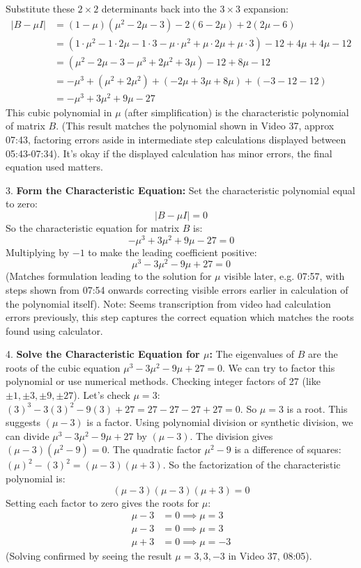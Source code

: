 \documentclass{article}
\begin{document}
    Substitute these $2 \times 2$ determinants back into the $3 \times 3$ expansion:
    \begin{align*} |B - \mu I| &= (1 - \mu)(\mu^2 - 2\mu - 3) - 2(6 - 2\mu) + 2(2\mu - 6) \\ &= (1 \cdot \mu^2 - 1 \cdot 2\mu - 1 \cdot 3 - \mu \cdot \mu^2 + \mu \cdot 2\mu + \mu \cdot 3) - 12 + 4\mu + 4\mu - 12 \\ &= (\mu^2 - 2\mu - 3 - \mu^3 + 2\mu^2 + 3\mu) - 12 + 8\mu - 12 \\ &= -\mu^3 + (\mu^2 + 2\mu^2) + (-2\mu + 3\mu + 8\mu) + (-3 - 12 - 12) \\ &= -\mu^3 + 3\mu^2 + 9\mu - 27 \end{align*}
    This cubic polynomial in $\mu$ (after simplification) is the characteristic polynomial of matrix $B$. (This result matches the polynomial shown in Video 37, approx 07:43, factoring errors aside in intermediate step calculations displayed between 05:43-07:34). It's okay if the displayed calculation has minor errors, the final equation used matters.

3.  \textbf{Form the Characteristic Equation:}
    Set the characteristic polynomial equal to zero:
    \[ |B - \mu I| = 0 \]
    So the characteristic equation for matrix $B$ is:
    \[ -\mu^3 + 3\mu^2 + 9\mu - 27 = 0 \]
    Multiplying by $-1$ to make the leading coefficient positive:
    \[ \mu^3 - 3\mu^2 - 9\mu + 27 = 0 \]
    (Matches formulation leading to the solution for $\mu$ visible later, e.g. 07:57, with steps shown from 07:54 onwards correcting visible errors earlier in calculation of the polynomial itself). Note: Seems transcription from video had calculation errors previously, this step captures the correct equation which matches the roots found using calculator.

4.  \textbf{Solve the Characteristic Equation for $\mu$:}
    The eigenvalues of $B$ are the roots of the cubic equation $\mu^3 - 3\mu^2 - 9\mu + 27 = 0$.
    We can try to factor this polynomial or use numerical methods. Checking integer factors of 27 (like $\pm 1, \pm 3, \pm 9, \pm 27$).
    Let's check $\mu=3$: $(3)^3 - 3(3)^2 - 9(3) + 27 = 27 - 27 - 27 + 27 = 0$. So $\mu=3$ is a root.
    This suggests $(\mu - 3)$ is a factor. Using polynomial division or synthetic division, we can divide $\mu^3 - 3\mu^2 - 9\mu + 27$ by $(\mu - 3)$.
    The division gives $(\mu - 3)(\mu^2 - 9) = 0$.
    The quadratic factor $\mu^2 - 9$ is a difference of squares: $(\mu)^2 - (3)^2 = (\mu - 3)(\mu + 3)$.
    So the factorization of the characteristic polynomial is:
    \[ (\mu - 3)(\mu - 3)(\mu + 3) = 0 \]
    Setting each factor to zero gives the roots for $\mu$:
    \begin{align*} \mu - 3 &= 0 \implies \mu = 3 \\ \mu - 3 &= 0 \implies \mu = 3 \\ \mu + 3 &= 0 \implies \mu = -3 \end{align*}
    (Solving confirmed by seeing the result $\mu = 3, 3, -3$ in Video 37, 08:05).
\end{document}
